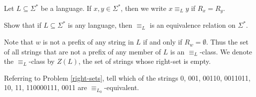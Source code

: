 \begin{dfn}
Let\/ $L \subseteq \Sigma^*$ be a language.  If\/ $x,y \in \Sigma^*$, then we write $x\equiv_L y$ if\/ $R_x = R_y$.
\end{dfn}

\begin{prb}
Show that if\/ $L \subseteq \Sigma^*$ is any language, then $\equiv_L$ is an equivalence relation on $\Sigma^*$.
\end{prb}

\noindent Note that $w$ is not a prefix of any string in $L$ if and only if $R_w = \emptyset$.  Thus the set of all strings that are not a prefix of any member of $L$ is an $\equiv_L$-class.  We denote the $\equiv_L$-class by $Z(L)$, the set of strings whose right-set is empty.

\begin{prb}
Referring to Problem \ref{right-sets}, tell which of the strings 0, 001, 00110, 0011011, 10, 11, 110000111, 0011 are $\equiv_{L_0}$-equivalent.
\end{prb}

\begin{comment}
\begin{prb}
In Problem \ref{L0} you computed $L_0$. Describe each of these sets.
\begin{enumerate}
\item $0L_0 = \{0u \mid u\in L_0\}$
\item $L_00 = \{u0 \mid u\in L_0\}$
\item $1L_0 = \{1u \mid u\in L_0\}$
\item $L_01 = \{u1 \mid u\in L_0\}$
\item $[0]$
\item $[11]$
\end{enumerate}
\end{prb}
\end{comment}

\begin{comment}
For each $w\in\{0,1\}^*$, the right-set $R_w$ is either $L_0$, $0L_0$, $1L_0$  or $\emptyset$.

\end{comment}

